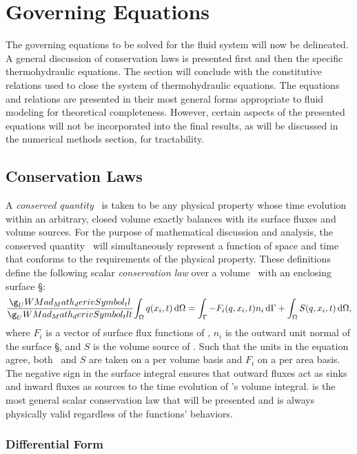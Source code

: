 \documentclass[12pt]{../UWMadThesis}
\begin{document}
\chapter{Governing Equations}

The governing equations to be solved for the fluid system will now be delineated.
A general discussion of conservation laws is presented first and then the specific thermohydraulic equations.
The section will conclude with the constitutive relations used to close the system of thermohydraulic equations.
The equations and relations are presented in their most general forms appropriate to fluid modeling for theoretical completeness.
However, certain aspects of the presented equations will not be incorporated into the final results, as will be discussed in the numerical methods section, for tractability.


\section{Conservation Laws}\label{CLawDefinition}

A \textit{conserved quantity} \q\ is taken to be any physical property whose time evolution within an arbitrary, closed volume exactly balances with its surface fluxes and volume sources.
For the purpose of mathematical discussion and analysis, the conserved quantity \q\ will simultaneously represent a function of space and time that conforms to the requirements of the physical property.
These definitions define the following scalar \textit{conservation law} over a volume \V\ with an enclosing surface \S:
\begin{equation}
    \deriv{}{t}\!  \IntV \q(x_i,t) \dV = \IntS -F_i(\q,x_i,t) n_i\dS + \IntV S(\q,x_i,t) \dV,
    \label{Eqn:GeneralIntegralCLaw}
\end{equation}
where $F_i$ is a vector of surface flux functions of \q, $n_i$ is the outward unit normal of the surface \S, and $S$ is the volume source of \q.
Such that the units in the equation agree, both \q\ and $S$ are taken on a per volume basis and $F_i$ on a per area basis.
The negative sign in the surface integral ensures that outward fluxes act as sinks and inward fluxes as sources to the time evolution of \q's volume integral.
 is the most general scalar conservation law that will be presented and is always physically valid regardless of the functions' behaviors.


\subsection{Differential Form}
\end{document}
